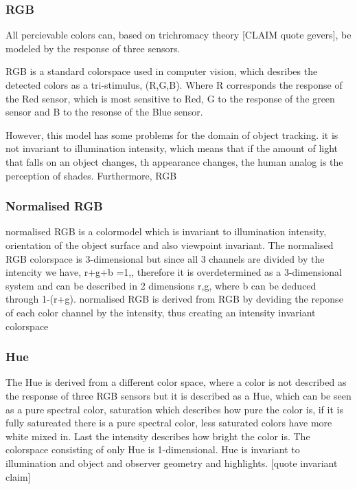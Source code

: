\documentclass[a4paper,11pt]{article}
\begin{document}
		\subsubsection{RGB}
		
		All percievable colors can, based on trichromacy theory [CLAIM quote gevers], be modeled by the response of three sensors. 
		
		RGB is a standard colorspace used in computer vision, which desribes the detected colors as a tri-stimulus, (R,G,B). Where R corresponds the response of the Red sensor, which is most sensitive to Red, G to the response of the green sensor and B to the resonse of the Blue sensor.

		However, this model has some problems for the domain of object tracking. it is not invariant to illumination intensity, which means that if the amount of light that falls on an object changes, th appearance changes, the human analog is the perception of shades. 
		Furthermore, RGB 
		

		

		\subsubsection{Normalised RGB}
		normalised RGB is a colormodel which is invariant to illumination intensity, orientation of the object surface and also viewpoint invariant. 
		The normalised RGB colorspace is 3-dimensional but since all 3 channels are divided by the intencity we have, r+g+b =1,, therefore it is overdetermined as a 3-dimensional system and can be described in 2 dimensions r,g, where b can be deduced through 1-(r+g).
		normalised RGB is derived from RGB by deviding the reponse of each color channel by the intensity, thus creating an intensity invariant colorspace
		\subsubsection{Hue}
		The Hue is derived from a different color space, where a color is not described as the response of three RGB sensors but it is described as a Hue, which can be seen as a pure spectral color, saturation which describes how pure the color is, if it is fully satureated there is a pure spectral color, less saturated colors have more white mixed in. Last the intensity describes how bright the color is. 
		The colorspace consisting of only Hue is 1-dimensional.
		Hue is invariant to illumination and object and observer geometry and highlights. [quote invariant claim]
\end{document}
